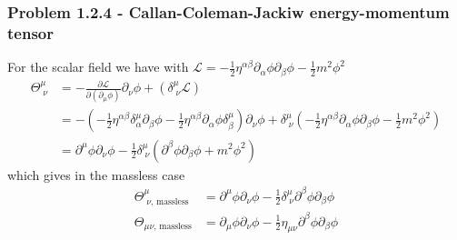 \documentclass[10pt,a4paper]{article}
\theoremstyle{definition}
\begin{document}
\subsubsection{Problem 1.2.4 - Callan-Coleman-Jackiw energy-momentum tensor}
For the scalar field we have with $\mathcal{L}=-\frac{1}{2}\eta^{\alpha\beta}\partial_\alpha\phi\partial_\beta\phi-\frac{1}{2}m^2\phi^2$
\begin{align}
    \Theta^\mu_{\;\nu}&=-\frac{\partial\mathcal{L}}{\partial(\partial_\mu\phi)}\partial_\nu\phi+(\delta^\mu_{\;\nu}\mathcal{L})\\
    &=-\left(-\frac{1}{2}\eta^{\alpha\beta}\delta^\mu_{\alpha}\partial_\beta\phi-\frac{1}{2}\eta^{\alpha\beta}\partial_\alpha\phi\delta^\mu_{\beta}\right)\partial_\nu\phi +\delta^\mu_{\;\nu}\left(-\frac{1}{2}\eta^{\alpha\beta}\partial_\alpha\phi\partial_\beta\phi-\frac{1}{2}m^2\phi^2\right)\\
    &=\partial^\mu\phi\partial_\nu\phi -\frac{1}{2}\delta^\mu_{\;\nu}(\partial^\beta\phi\partial_\beta\phi+m^2\phi^2)
\end{align}
which gives in the massless case
\begin{align}
    \Theta^\mu_{\;\nu\text{, massless}}&=\partial^\mu\phi\partial_\nu\phi -\frac{1}{2}\delta^\mu_{\;\nu}\partial^\beta\phi\partial_\beta\phi\\
    \Theta_{\mu\nu\text{, massless}}&=\partial_\mu\phi\partial_\nu\phi -\frac{1}{2}\eta_{\mu\nu}\partial^\beta\phi\partial_\beta\phi
\end{align}
\end{document}
